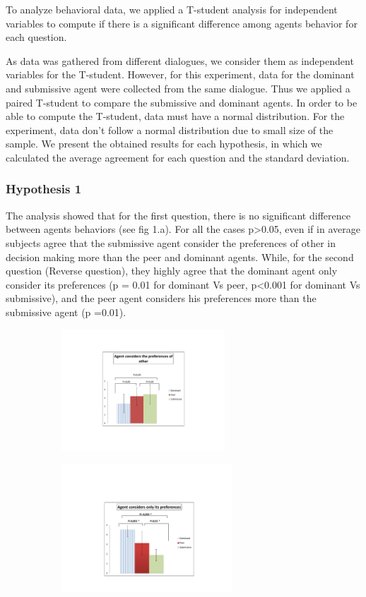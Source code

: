 \documentclass{llncs}
\begin{document}
\par To analyze behavioral data, we applied a T-student analysis for independent variables to compute if there is a significant difference among agents behavior for each question.  

\par As data was gathered from different dialogues, we consider them as independent variables for the T-student. However, for this experiment, data for the dominant and submissive agent were collected from the same dialogue. Thus we applied a paired T-student to compare the submissive and dominant agents.
In order to be able to compute the T-student, data must have a normal distribution. For the experiment, data don't follow a normal distribution due to small size of the sample.
We present the obtained results for each hypothesis, in which we calculated the average agreement for each question and the standard deviation.

\subsubsection{Hypothesis 1 }
The analysis showed that for the first question, there is no significant difference between agents behaviors (see fig 1.a). For all the cases p>0.05, even if in average subjects agree that the submissive agent consider the preferences of other in decision making more than the peer and dominant agents. While, for the second question (Reverse question), they highly agree that the dominant agent only consider its preferences (p = 0.01 for dominant Vs peer, p<0.001 for dominant Vs submissive), and the peer agent considers his preferences more than the submissive agent (p =0.01). 

\begin{figure}[t]
	\begin{subfigure}{2.3in}
		\centerline{\includegraphics[width=2.4in]{figs/h1a}}
		\vskip 8pt 
	\end{subfigure}
		\begin{subfigure}{2.3in}
			\centerline{\includegraphics[width=2.5in]{figs/h1b}}
			\vskip 8pt 
		\end{subfigure}
	\vskip 8pt
\end{figure}


\end{document}
